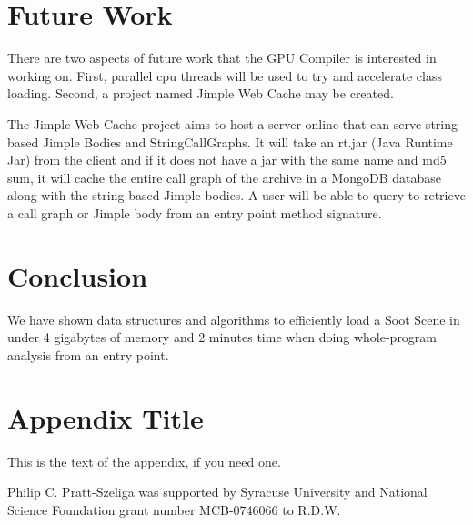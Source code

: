 \documentclass[preprint]{sigplanconf}
\begin{document}
\section{Future Work}
\label{sec:future}
There are two aspects of future work that the \rb GPU Compiler is interested in working on. First, parallel cpu threads will be used to try and accelerate class loading. Second, a project named Jimple Web Cache may be created.

The Jimple Web Cache project aims to host a server online that can serve string based Jimple Bodies and StringCallGraphs. It will take an rt.jar (Java Runtime Jar) from the client and if it does not have a jar with the same name and md5 sum, it will cache the entire call graph of the archive in a MongoDB database along with the string based Jimple bodies. A user will be able to query to retrieve a call graph or Jimple body from an entry point method signature.

\section{Conclusion}
\label{sec:conclusion}
We have shown data structures and algorithms to efficiently load a Soot Scene in under 4 gigabytes of memory and 2 minutes time when doing whole-program analysis from an entry point.

\appendix
\section{Appendix Title}

This is the text of the appendix, if you need one.

\acks
Philip C. Pratt-Szeliga was supported by Syracuse University and National Science Foundation grant number MCB-0746066 to R.D.W.









\end{document}
